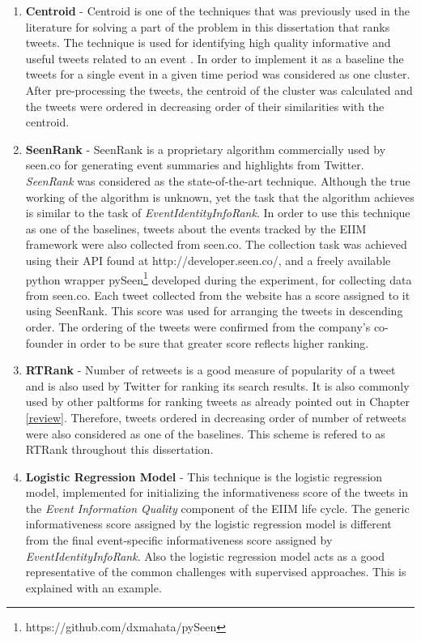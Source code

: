 \begin{enumerate}
\item \textbf{Centroid} - Centroid is one of the techniques that was previously used in the literature for solving a part of the problem in this dissertation that ranks tweets. The technique is used for identifying high quality informative and useful tweets related to an event   \cite{becker2011selecting}. In order to implement it as a baseline the tweets for a single event in a given time period was considered as one cluster. After pre-processing the tweets, the centroid of the cluster was calculated and the tweets were ordered in decreasing order of their similarities with the centroid.

\item \textbf{SeenRank} - SeenRank is a proprietary algorithm commercially used by seen.co for generating event summaries and highlights from Twitter. \textit{SeenRank} was considered as the state-of-the-art technique. Although the true working of the algorithm is unknown, yet the task that the algorithm achieves is similar to the task of \textit{EventIdentityInfoRank}. In order to use this technique as one of the baselines, tweets about the events tracked by the EIIM framework were also collected from seen.co. The collection task was achieved using their API found at http://developer.seen.co/, and a freely available python wrapper pySeen\footnote{https://github.com/dxmahata/pySeen} developed during the experiment, for collecting data from seen.co. Each tweet collected from the website has a score assigned to it using SeenRank. This score was used for arranging the tweets in descending order. The ordering of the tweets were confirmed from the company's co-founder in order to be sure that greater score reflects higher ranking.



\item \textbf{RTRank} - Number of retweets is a good measure of popularity of a tweet and is also used by Twitter for ranking its search results. It is also commonly used by other paltforms for ranking tweets as already pointed out in Chapter \ref{review}. Therefore, tweets ordered in decreasing order of number of retweets were also considered as one of the baselines. This scheme is refered to as RTRank throughout this dissertation.

\item \textbf{Logistic Regression Model} - This technique is the logistic regression model, implemented for initializing the informativeness score of the tweets in the \textit{Event Information Quality} component of the EIIM life cycle. The generic informativeness score assigned by the logistic regression model is different from the final event-specific informativeness score assigned by \textit{EventIdentityInfoRank}. Also the logistic regression model acts as a good representative of the common challenges with supervised approaches. This is explained with an example.


\end{enumerate}
